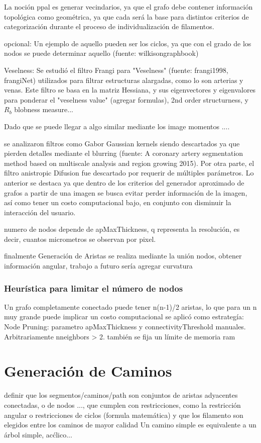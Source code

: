 La noción ppal es generar vecindarios, ya que el grafo debe contener información topológica como geométrica, ya que cada será la base para distintos criterios de categorización durante el proceso de individualización de filamentos. 

opcional: Un ejemplo de aquello pueden ser los ciclos, ya que con el grado de los nodos se puede determinar aquello (fuente: wilkisongraphbook)

Veselness: Se estudió el filtro Frangi para "Veselness" (fuente: frangi1998, frangiNet) utilizados para filtrar estructuras alargadas, como lo son arterias y venas. Este filtro se basa en la matriz Hessiana, y sus eigenvectores y eigenvalores para ponderar el "veselness value" (agregar formulas), 2nd order structurness, y $R_b$ blobness measure...

Dado que se puede llegar a algo similar mediante los image momentos ....

se analizaron filtros como Gabor Gaussian kernels siendo descartados ya que pierden detalles mediante el blurring (fuente: A coronary artery segmentation method based on multiscale analysis and region growing 2015). Por otra parte, el filtro  anistropic Difusion fue descartado por requerir de múltiples parámetros. 
Lo anterior se destaca ya que dentro de los criterios del generador aproximado de grafos a partir de una imagen se busca evitar perder información de la imagen, así como tener un costo computacional bajo, en conjunto con disminuir la interacción del usuario. 

numero de nodos depende de apMaxThickness, q representa la resoluci\'on, es decir, cuantos micrometros se observan por pixel.

finalmente Generaci\'on de Aristas se realiza mediante la uni\'on nodos, obtener informaci\'on angular, trabajo a futuro ser\'ia agregar curvatura 

\subsubsection{Heurística para limitar el n\'umero de nodos}
Un grafo completamente conectado puede tener n(n-1)/2 aristas, lo que para un n muy grande puede implicar un costo computacional se aplicó como estrategía: 
Node Pruning: parametro apMaxThickness y connectivityThreshold manuales. Arbitrariamente n\textdegree neighbors > 2. también se fija un límite de memoria ram


\section{Generaci\'on de Caminos}
definir que los segmentos/caminos/path son conjuntos de aristas adyacentes conectadas, o de nodos ..., que cumplen con restricciones, como la restricción angular o restricciones de ciclos (formula matem\'atica) y que los filamento son elegidos entre los caminos de mayor calidad
Un camino simple es equivalente a un \'arbol simple, ac\'clico...


